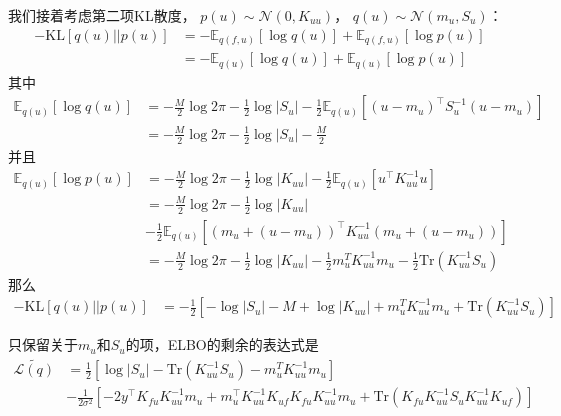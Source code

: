 我们接着考虑第二项KL散度， $p(u) \sim \mathcal N(0, K_{uu})$， $q(u) \sim \mathcal N(m_u, S_u)$：
\begin{equation}
    \begin{aligned}
        -\text{KL} \left [q(u) || p(u) \right ] &=
        -\mathbb E_{q(f, u)} \left [ \log q(u) \right ] + \mathbb E_{q(f, u)} \left [ \log p(u) \right ] \\
        &= -\mathbb E_{q(u)} \left [ \log q(u) \right ] + \mathbb E_{q(u)} \left [ \log p(u) \right ]
    \end{aligned}
\end{equation}
其中
\begin{equation}
    \begin{aligned}
        \mathbb E_{q(u)} \left [ \log q(u) \right ] &= -\frac{M}{2} \log 2 \pi - \frac{1}{2} \log | S_u |
        -\frac{1}{2} \mathbb E_{q(u)} \left [ (u-m_u)^\top S_u^{-1} (u-m_u) \right ] \\
        &= -\frac{M}{2} \log 2 \pi - \frac{1}{2} \log | S_u | - \frac{M}{2}
    \end{aligned}  
\end{equation}
并且
\begin{equation}
    \begin{aligned}
        \mathbb E_{q(u)} \left [ \log p(u) \right ] &= -\frac{M}{2} \log 2 \pi - \frac{1}{2} \log | K_{uu} |
        -\frac{1}{2} \mathbb E_{q(u)} \left [ u^\top K_{uu}^{-1} u \right ] \\
        &= -\frac{M}{2} \log 2 \pi - \frac{1}{2} \log | K_{uu} | \\
        &-\frac{1}{2} \mathbb E_{q(u)} \left [ (m_u + (u-m_u))^\top K_{uu}^{-1} (m_u + (u-m_u)) \right ] \\
        &= -\frac{M}{2} \log 2 \pi - \frac{1}{2} \log | K_{uu} | - \frac{1}{2} m_u^T K_{uu}^{-1} m_u
        -\frac{1}{2} \text{Tr}(K_{uu}^{-1}S_u)
    \end{aligned}  
\end{equation}
那么
\begin{equation}
    \begin{aligned}
        -\text{KL} \left [q(u) || p(u) \right ] &=
        -\frac{1}{2} \left [ -\log |S_u| - M + \log |K_{uu}| + m_u^T K_{uu}^{-1} m_u + \text{Tr}(K_{uu}^{-1}S_u) \right ]
    \end{aligned}
\end{equation}

只保留关于$m_u$和$S_u$的项，ELBO的剩余的表达式是
\begin{equation}
    \begin{aligned}
        \tilde{\mathcal L(q)} &= \frac{1}{2} \left [
            \log |S_u| - \text{Tr}(K_{uu}^{-1}S_u) - m_u^T K_{uu}^{-1} m_u
        \right ] \\
        & -\frac{1}{2 \sigma^2} \left [
            -2y^\top K_{fu} K_{uu}^{-1} m_u + m_u^\top K_{uu}^{-1} K_{uf} K_{fu} K_{uu}^{-1} m_u
            + \text{Tr}(K_{fu}K_{uu}^{-1}S_u K_{uu}^{-1}K_{uf})
        \right ]
    \end{aligned}
\end{equation}

